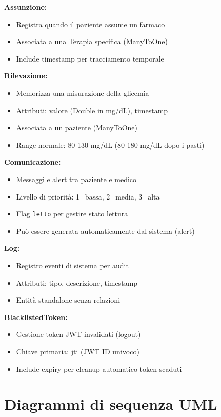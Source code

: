 \documentclass{report}
\begin{document}
\textbf{Assunzione:}
\begin{itemize}
    \item Registra quando il paziente assume un farmaco
    \item Associata a una Terapia specifica (ManyToOne)
    \item Include timestamp per tracciamento temporale
\end{itemize}

\textbf{Rilevazione:}
\begin{itemize}
    \item Memorizza una misurazione della glicemia
    \item Attributi: valore (Double in mg/dL), timestamp
    \item Associata a un paziente (ManyToOne)
    \item Range normale: 80-130 mg/dL (80-180 mg/dL dopo i pasti)
\end{itemize}

\textbf{Comunicazione:}
\begin{itemize}
    \item Messaggi e alert tra paziente e medico
    \item Livello di priorità: 1=bassa, 2=media, 3=alta
    \item Flag \texttt{letto} per gestire stato lettura
    \item Può essere generata automaticamente dal sistema (alert)
\end{itemize}

\textbf{Log:}
\begin{itemize}
    \item Registro eventi di sistema per audit
    \item Attributi: tipo, descrizione, timestamp
    \item Entità standalone senza relazioni
\end{itemize}

\textbf{BlacklistedToken:}
\begin{itemize}
    \item Gestione token JWT invalidati (logout)
    \item Chiave primaria: jti (JWT ID univoco)
    \item Include expiry per cleanup automatico token scaduti
\end{itemize}

\section{Diagrammi di sequenza UML}
\end{document}
